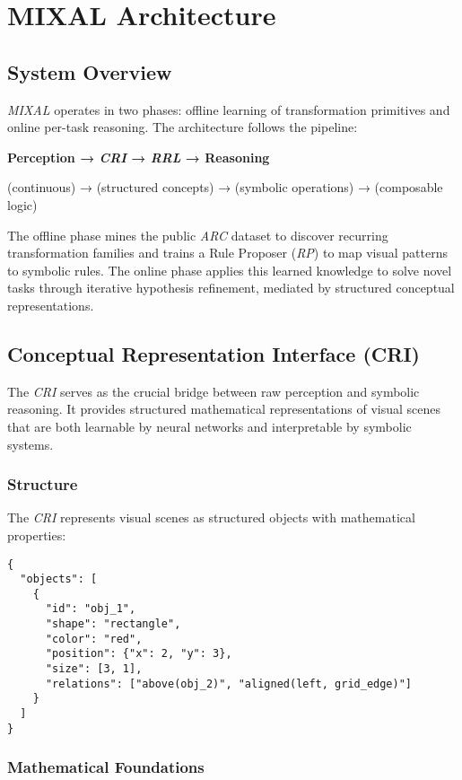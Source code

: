 \documentclass[12pt]{article}
\newcommand{\arc}{\textit{ARC}}
\newcommand{\MIXAL}{\textit{MIXAL}}
\newcommand{\rp}{\textit{RP}}
\newcommand{\cri}{\textit{CRI}}
\newcommand{\rrl}{\textit{RRL}}
\begin{document}
\section{MIXAL Architecture}

\subsection{System Overview}

\MIXAL{} operates in two phases: offline learning of transformation primitives and online per-task reasoning. The architecture follows the pipeline:

\textbf{Perception → \cri{} → \rrl{} → Reasoning}

(continuous) → (structured concepts) → (symbolic operations) → (composable logic)

The offline phase mines the public \arc{} dataset to discover recurring transformation families and trains a Rule Proposer (\rp{}) to map visual patterns to symbolic rules. The online phase applies this learned knowledge to solve novel tasks through iterative hypothesis refinement, mediated by structured conceptual representations.

\subsection{Conceptual Representation Interface (CRI)}

The \cri{} serves as the crucial bridge between raw perception and symbolic reasoning. It provides structured mathematical representations of visual scenes that are both learnable by neural networks and interpretable by symbolic systems.

\subsubsection{Structure}

The \cri{} represents visual scenes as structured objects with mathematical properties:

\begin{verbatim}
{
  "objects": [
    {
      "id": "obj_1",
      "shape": "rectangle",
      "color": "red",
      "position": {"x": 2, "y": 3},
      "size": [3, 1],
      "relations": ["above(obj_2)", "aligned(left, grid_edge)"]
    }
  ]
}
\end{verbatim}

\subsubsection{Mathematical Foundations}
\end{document}

